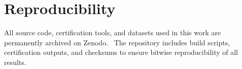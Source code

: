\documentclass[11pt]{article}
\theoremstyle{inline}
\theoremstyle{break}
\theoremstyle{break}
\theoremstyle{break}
\theoremstyle{break}
\theoremstyle{break}
\theoremstyle{break}
\theoremstyle{break}
\theoremstyle{inline}
\begin{document}
\section*{Reproducibility}

All source code, certification tools, and datasets used in this work are permanently archived on Zenodo.~\cite{Riemers2025SieveGoldbach}  
The repository includes build scripts, certification outputs, and checksums to ensure bitwise reproducibility of all results.

\clearpage


\end{document}
